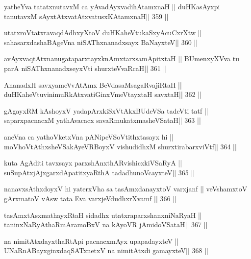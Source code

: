 \begin{shl}
yatheYva tatatxnutavxM ca yAvadAyxvadihA\s\s tamxnaH ||
duHKasAyxpi tanutavxM sAyxtAtxvatAtxvatusxKAtamxnaH\hfill || 359 ||
\end{shl}

\begin{shl}
utatxroVtatxravaqdAdhxyX\s toV duHKaheVtukaSxyAcuCxrXtw ||
sahasarxdashaBAgeVna niSAThx\s\s nanadxsayx BaNayxteV\hfill || 360 ||
\end{shl}

\begin{shl}
avAyxvaqtAtxnanugataparxtayxknAmxtarxsamApitxtaH ||
BUmenxyXVva tu parA niSAThx\s\s nanadxseyxVti shurxteVvaRcaH\hfill || 361 ||
\end{shl}

\begin{shl}
AnanadxH savxyameVvA\s\s tAmx BeVdasaMsagaRvajiRtaH ||
duHKaheVtuvinimuRkAtxvatiGinxVmeVtayxtaH savxtaH\hfill || 362 ||
\end{shl}

\begin{shl}
gAgayxRM kAshoyxV yadapArxkiSxVtAkxBUdeVSa tadeVti tatf ||
saparxpacnacxM yathAvacacx savaRmukatxmasheVSataH\hfill || 363 ||
\end{shl}

\begin{shl}
aneVna ca yathoVketxVna pANipeVSoVtithxtasayx hi ||
moVhoVtAthxsheVSakAyeVRBoyxV vishudidhxM shurxtirabarxviVtf\hfill || 364 ||
\end{shl}

\begin{shl}
kuta AgAditi tavxsayx parxshAnxthARvishicxkiVSaRyA ||
suSupAtxjAjxgarxdApatitxyaRthA tadadhunoVcayxteV\hfill || 365 ||
\end{shl}

\begin{shl}
nanavxsAthxdoyxV hi yaterxVha sa tasAmxdanayxtoV varxjanf ||
veVshamxtoV gArxmatoV vA\s sw tata Eva varxjeVdudhxrXvamf \hfill || 366 ||
\end{shl}

\begin{shl}
tasAmxtAsxmathayxRtaH sidadhx utatxraparxshanxniNaRyaH ||
taninxNaRyAthaRmAramoBxV na kAyoVR jAmidoVSataH\hfill || 367 ||
\end{shl}

\begin{shl}
na nimitAtxdayxthaRtA\s pi pacnacxmAyx upapadayxteV ||
UNaRnABayxginxdaqSATxnetxV na nimitAtxdi gamayxteV\hfill || 368 ||
\end{shl}

